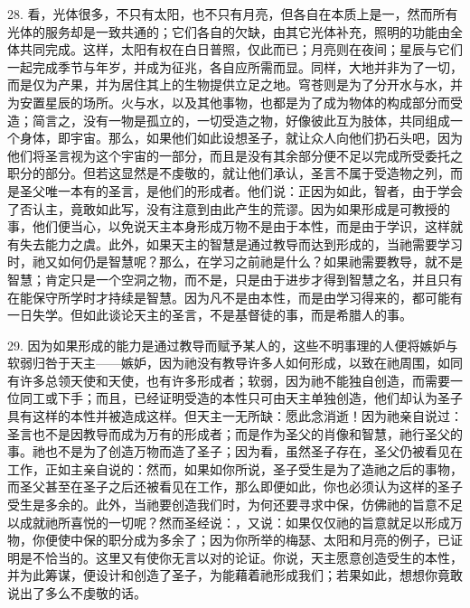 28. 看，光体很多，不只有太阳，也不只有月亮，但各自在本质上是一，然而所有光体的服务却是一致共通的；它们各自的欠缺，由其它光体补充，照明的功能由全体共同完成。这样，太阳有权在白日普照，仅此而已；月亮则在夜间；星辰与它们一起完成季节与年岁，并成为征兆，各自应所需而显。同样，大地并非为了一切，而是仅为产果，并为居住其上的生物提供立足之地。穹苍则是为了分开水与水，并为安置星辰的场所。火与水，以及其他事物，也都是为了成为物体的构成部分而受造；简言之，没有一物是孤立的，一切受造之物，好像彼此互为肢体，共同组成一个身体，即宇宙。那么，如果他们如此设想圣子，就让众人向他们扔石头吧，因为他们将圣言视为这个宇宙的一部分，而且是没有其余部分便不足以完成所受委托之职分的部分。但若这显然是不虔敬的，就让他们承认，圣言不属于受造物之列，而是圣父唯一本有的圣言，是他们的形成者。他们说：正因为如此，智者，由于学会了否认主，竟敢如此写，没有注意到由此产生的荒谬。因为如果形成是可教授的事，他们便当心，以免说天主本身形成万物不是由于本性，而是由于学识，这样就有失去能力之虞。此外，如果天主的智慧是通过教导而达到形成的，当祂需要学习时，祂又如何仍是智慧呢？那么，在学习之前祂是什么？如果祂需要教导，就不是智慧；肯定只是一个空洞之物，而不是，只是由于进步才得到智慧之名，并且只有在能保守所学时才持续是智慧。因为凡不是由本性，而是由学习得来的，都可能有一日失学。但如此谈论天主的圣言，不是基督徒的事，而是希腊人的事。\par

29. 因为如果形成的能力是通过教导而赋予某人的，这些不明事理的人便将嫉妒与软弱归咎于天主——嫉妒，因为祂没有教导许多人如何形成，以致在祂周围，如同有许多总领天使和天使，也有许多形成者；软弱，因为祂不能独自创造，而需要一位同工或下手；而且，已经证明受造的本性只可由天主单独创造，他们却认为圣子具有这样的本性并被造成这样。但天主一无所缺：愿此念消逝！因为祂亲自说过：圣言也不是因教导而成为万有的形成者；而是作为圣父的肖像和智慧，祂行圣父的事。祂也不是为了创造万物而造了圣子；因为看，虽然圣子存在，圣父仍被看见在工作，正如主亲自说的：然而，如果如你所说，圣子受生是为了造祂之后的事物，而圣父甚至在圣子之后还被看见在工作，那么即便如此，你也必须认为这样的圣子受生是多余的。此外，当祂要创造我们时，为何还要寻求中保，仿佛祂的旨意不足以成就祂所喜悦的一切呢？然而圣经说：，又说：如果仅仅祂的旨意就足以形成万物，你便使中保的职分成为多余了；因为你所举的梅瑟、太阳和月亮的例子，已证明是不恰当的。这里又有使你无言以对的论证。你说，天主愿意创造受生的本性，并为此筹谋，便设计和创造了圣子，为能藉着祂形成我们；若果如此，想想你竟敢说出了多么不虔敬的话。\par

